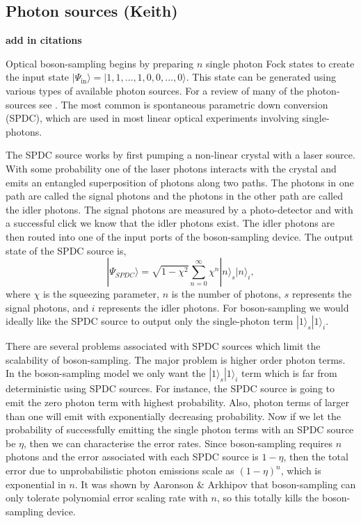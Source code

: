 \documentclass[aps,pra,twocolumn,amsmath,amssymb,nofootinbib,superscriptaddress]{revtex4}
\newcommand{\ket}[1]{|#1\rangle}
\begin{document}
\subsection{Photon sources (Keith)}

\textbf{add in citations}

Optical boson-sampling begins by preparing $n$ single photon Fock states to create the input state $\ket{\Psi_{\mathrm{in}}}=\ket{1,1,\dots,1,0,0,\dots,0}$. This state can be generated using various types of available photon sources. For a review of many of the photon-sources see \cite{bib:SourceAndDetectorReview}. The most common is spontaneous parametric down conversion (SPDC), which are used in most linear optical experiments involving single-photons. 

The SPDC source works by first pumping a non-linear crystal with a laser source. With some probability one of the laser photons interacts with the crystal and emits an entangled superposition of photons along two paths. The photons in one path are called the signal photons and the photons in the other path are called the idler photons. The signal photons are measured by a photo-detector and with a successful click we know that the idler photons exist. The idler photons are then routed into one of the input ports of the boson-sampling device. The output state of the SPDC source is,
\begin{equation} \label{SPDC}
\ket{\Psi_{SPDC}} = \sqrt{1-\chi^2}\sum_{n=0}^{\infty}\chi^n\ket{n}_s\ket{n}_i,
\end{equation}
where $\chi$ is the squeezing parameter, $n$ is the number of photons, $s$ represents the signal photons, and $i$ represents the idler photons. For boson-sampling we would ideally like the SPDC source to output only the single-photon term $\ket{1}_s\ket{1}_i$.  

There are several problems associated with SPDC sources which limit the scalability of boson-sampling. The major problem is higher order photon terms. In the boson-sampling model we only want the $\ket{1}_s\ket{1}_i$ term which is far from deterministic using SPDC sources. For instance, the SPDC source is going to emit the zero photon term with highest probability. Also, photon terms of larger than one will emit with exponentially decreasing probability. Now if we let the probability of successfully emitting the single photon terms with an SPDC source be $\eta$, then we can characterise the error rates. Since boson-sampling requires $n$ photons and the error associated with each SPDC source is $1-\eta$, then the total error due to unprobabilistic photon emissions scale as $(1-\eta)^{n}$, which is exponential in $n$. It was shown by Aaronson \& Arkhipov that boson-sampling can only tolerate polynomial error scaling rate with $n$, so this totally kills the boson-sampling device.
\end{document}
